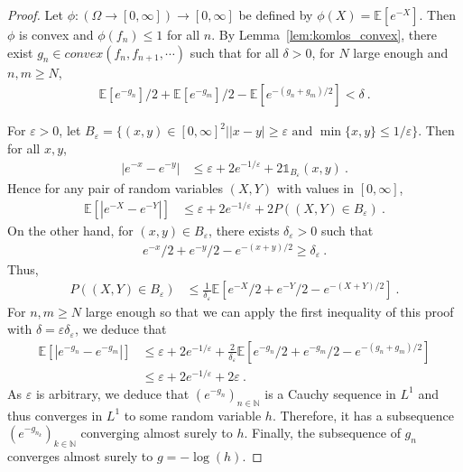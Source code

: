\begin{proof}
Let $\phi : (\Omega \to [0, \infty]) \to [0, \infty]$ be defined by $\phi(X) = \mathbb{E}[e^{-X}]$.
Then $\phi$ is convex and $\phi(f_n) \le 1$ for all $n$.
By Lemma~\ref{lem:komlos_convex}, there exist $g_n \in convex( f_n, f_{n+1}, \cdots)$ such that for all $\delta>0$, for $N$ large enough and $n, m \ge N$,
\begin{align*}
  \mathbb{E}[e^{-g_n}]/2 + \mathbb{E}[e^{-g_m}]/2 - \mathbb{E}[e^{-(g_n + g_m)/2}] < \delta
  \: .
\end{align*}

For $\varepsilon > 0$, let $B_\varepsilon = \{(x, y) \in [0, \infty]^2 \mid \vert x - y \vert \ge \varepsilon \text{ and } \min\{x, y\} \le 1/\varepsilon \}$.
Then for all $x, y$,
\begin{align*}
  \left\vert e^{-x} - e^{-y} \right\vert
  &\le \varepsilon + 2 e^{-1/\varepsilon} + 2 \mathbb{1}_{B_\varepsilon}(x, y)
  \: .
\end{align*}
Hence for any pair of random variables $(X, Y)$ with values in $[0, \infty]$,
\begin{align*}
  \mathbb{E}\left[\left\vert e^{-X} - e^{-Y} \right\vert\right]
  &\le \varepsilon + 2 e^{-1/\varepsilon} + 2 P((X, Y) \in B_\varepsilon) \: .
\end{align*}
On the other hand, for $(x, y) \in B_\varepsilon$, there exists $\delta_\varepsilon > 0$ such that
\begin{align*}
  e^{-x}/2 + e^{-y}/2 - e^{-(x + y)/2} \ge \delta_\varepsilon
  \: .
\end{align*}
Thus,
\begin{align*}
  P((X, Y) \in B_\varepsilon)
  &\le \frac{1}{\delta_\varepsilon} \mathbb{E}\left[ e^{-X}/2 + e^{-Y}/2 - e^{-(X + Y)/2} \right]
  \: .
\end{align*}
For $n, m \ge N$ large enough so that we can apply the first inequality of this proof with $\delta = \varepsilon \delta_\varepsilon$, we deduce that
\begin{align*}
  \mathbb{E}\left[\left\vert e^{-g_n} - e^{-g_m} \right\vert\right]
  &\le \varepsilon + 2 e^{-1/\varepsilon} + \frac{2}{\delta_\varepsilon} \mathbb{E}\left[ e^{-g_n}/2 + e^{-g_m}/2 - e^{-(g_n + g_m)/2} \right] \\
  &\le \varepsilon + 2 e^{-1/\varepsilon} + 2 \varepsilon
  \: .
\end{align*}
As $\varepsilon$ is arbitrary, we deduce that $(e^{-g_n})_{n\in\mathbb{N}}$ is a Cauchy sequence in $L^1$ and thus converges in $L^1$ to some random variable $h$.
Therefore, it has a subsequence $(e^{-g_{n_k}})_{k\in\mathbb{N}}$ converging almost surely to $h$.
Finally, the subsequence of $g_n$ converges almost surely to $g = -\log(h)$.
\end{proof}





